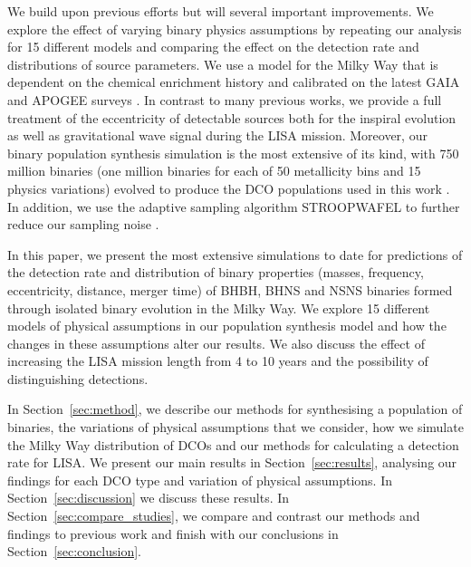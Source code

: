 We build upon previous efforts but will several important improvements. We explore the effect of varying binary physics assumptions by repeating our analysis for 15 different models and comparing the effect on the detection rate and distributions of source parameters. We use a model for the Milky Way that is dependent on the chemical enrichment history and calibrated on the latest GAIA and APOGEE surveys \citep{Frankel+2018}. In contrast to many previous works, we provide a full treatment of the eccentricity of detectable sources both for the inspiral evolution as well as gravitational wave signal during the LISA mission. Moreover, our binary population synthesis simulation is the most extensive of its kind, with 750 million binaries (one million binaries for each of 50 metallicity bins and 15 physics variations) evolved to produce the DCO populations used in this work \citep{Broekgaarden+2021}. In addition, we use the adaptive sampling algorithm STROOPWAFEL to further reduce our sampling noise \citep{Broekgaarden+2019}.

In this paper, we present the most extensive simulations to date for predictions of the detection rate and distribution of binary properties (masses, frequency, eccentricity, distance, merger time) of BHBH, BHNS and NSNS binaries formed through isolated binary evolution in the Milky Way. We explore 15 different models of physical assumptions in our population synthesis model and how the changes in these assumptions alter our results. We also discuss the effect of increasing the LISA mission length from 4 to 10 years and the possibility of distinguishing detections.

In Section~\ref{sec:method}, we describe our methods for synthesising a population of binaries, the variations of physical assumptions that we consider, how we simulate the Milky Way distribution of DCOs and our methods for calculating a detection rate for LISA. We present our main results in Section~\ref{sec:results}, analysing our findings for each DCO type and variation of physical assumptions. In Section~\ref{sec:discussion} we discuss these results. In Section~\ref{sec:compare_studies}, we compare and contrast our methods and findings to previous work and finish with our conclusions in Section~\ref{sec:conclusion}.